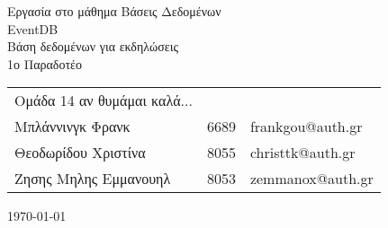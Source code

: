 \documentclass[11pt]{article}
\makeatletter
\newcommand{\ypertitlos}{Εργασία στο μάθημα Βάσεις Δεδομένων}
\newcommand{\titlos}{EventDB}
\newcommand{\ypotitlos}{Βάση δεδομένων για εκδηλώσεις}
\newcommand{\paradoteo}{1ο Παραδοτέο}
\newcommand{\omada}{Ομάδα 14 αν θυμάμαι καλά...}
\newcommand{\student}[3]{#1&#2&#3\\}
\newcommand{\melosA}{\student{Μπλάννινγκ Φρανκ}{6689}{frankgou@auth.gr}}
\newcommand{\melosB}{\student{Θεοδωρίδου Χριστίνα}{8055}{christtk@auth.gr}}
\newcommand{\melosC}{\student{Ζησης Μηλης Εμμανουηλ}{8053}{zemmanox@auth.gr}}
\newcommand{\hmnia}{\today}
\makeatother
\begin{document}
  \thispagestyle{empty}
  {\centering
    \Large\ypertitlos\\
    \vspace{7cm}
    \Huge\titlos\\
    \Large\ypotitlos\\
    \vspace{2cm}
  }
  \hfill \paradoteo
  
  \vspace{8cm}
  \begin{tabular}[b]{l l l}
    \omada&&\\
    \melosA
    \melosB 
    \melosC
  \end{tabular}
  
  {\centering
    \vspace{2cm}
    \hmnia\\
  }
  \newpage

  \tableofcontents
  \listoffigures

  \newpage
  
  
  
  
  
  

\end{document}

